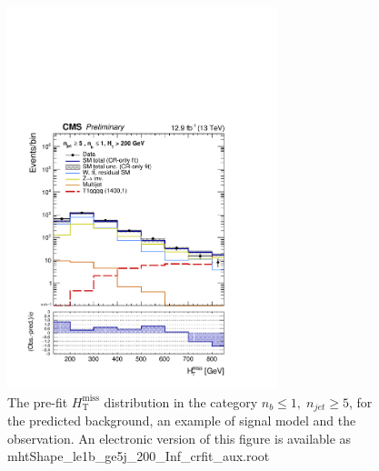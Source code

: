 \clearpage
\begin{figure}[tbhp]
    \caption{ 
    The pre-fit $H_{\mathrm{T}}^{\mathrm{miss}}$ distribution in the category $n_{b}\leq 1, \; n_{jet} \geq 5$, 
    for the predicted background, an example of signal model and the observation.
    An electronic version of this figure is available as mhtShape\_le1b\_ge5j\_200\_Inf\_crfit\_aux.root
    \label{fig:mhtShape_le1b_ge5j_crfit} }
  \begin{center}
  \includegraphics[width=0.7\textwidth]{mhtShape_le1b_ge5j_200_Inf_crfit_aux}
  \end{center}
\end{figure}


